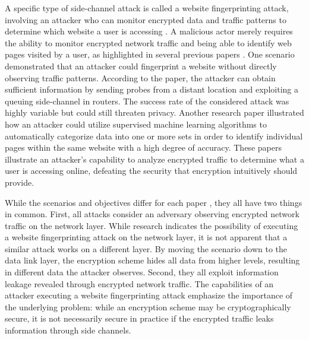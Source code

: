 A specific type of side-channel attack is called a website fingerprinting attack, involving an attacker who can monitor encrypted data and traffic patterns to determine which website a user is accessing \cite{DBLP:journals/popets/WangG16}. A malicious actor merely requires the ability to monitor encrypted network traffic and being able to identify web pages visited by a user, as highlighted in several previous papers \cite{DBLP:conf/sp/DyerCRS12, DBLP:conf/ctrsa/GellertJLN22, DBLP:conf/pet/GongBKS12, DBLP:conf/pet/Hintz02, DBLP:conf/pet/MillerHJT14, DBLP:conf/ccnc/MuehlsteinZBKDD17, DBLP:journals/popets/WangG16}. One scenario \cite{DBLP:conf/pet/GongBKS12} demonstrated that an attacker could fingerprint a website without directly observing traffic patterns. According to the paper, the attacker can obtain sufficient information by sending probes from a distant location and exploiting a queuing side-channel in routers. The success rate of the considered attack was highly variable but could still threaten privacy. Another research paper \cite{DBLP:conf/ccnc/MuehlsteinZBKDD17} illustrated how an attacker could utilize supervised machine learning algorithms to automatically categorize data into one or more sets in order to identify individual pages within the same website with a high degree of accuracy. These papers illustrate an attacker's capability to analyze encrypted traffic to determine what a user is accessing online, defeating the security that encryption intuitively should provide. 

While the scenarios and objectives differ for each paper \cite{DBLP:conf/sp/DyerCRS12, DBLP:conf/ctrsa/GellertJLN22, DBLP:conf/pet/GongBKS12, DBLP:conf/pet/Hintz02, DBLP:conf/pet/MillerHJT14, DBLP:conf/ccnc/MuehlsteinZBKDD17, DBLP:journals/popets/WangG16}, they all have two things in common. First, all attacks consider an adversary observing encrypted network traffic on the network layer. While research indicates the possibility of executing a website fingerprinting attack on the network layer, it is not apparent that a similar attack works on a different layer. By moving the scenario down to the data link layer, the encryption scheme hides all data from higher levels, resulting in different data the attacker observes. Second, they all exploit information leakage revealed through encrypted network traffic. The capabilities of an attacker executing a website fingerprinting attack emphasize the importance of the underlying problem: while an encryption scheme may be cryptographically secure, it is not necessarily secure in practice if the encrypted traffic leaks information through side channels.

